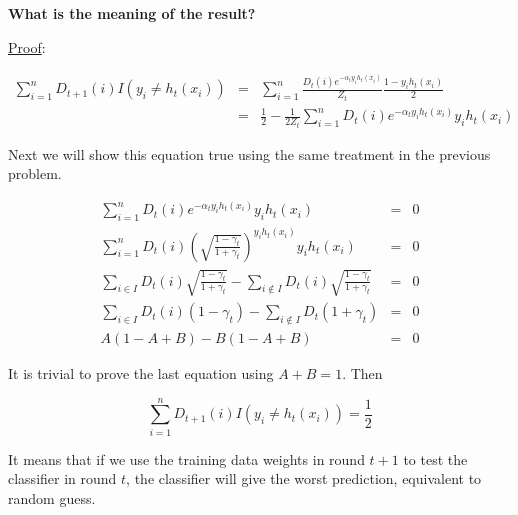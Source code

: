 \documentclass[UTF8]{ctexart}
\begin{document}
\textbf{What is the meaning of the result?}\par
\uline{Proof}:\par
\begin{eqnarray*}
\sum_{i=1}^{n}D_{t+1}(i)I(y_{i}\neq h_{t}(x_{i}))&=&\sum_{i=1}^{n}\frac{D_{t}(i)e^{-\alpha_{t}y_{i}h_{t}(x_{i})}}{Z_{t}}\frac{1-y_{i}h_{t}(x_{i})}{2}\\
&=&\frac{1}{2}-\frac{1}{2Z_{t}}\sum_{i=1}^{n}D_{t}(i)e^{-\alpha_{t}y_{i}h_{t}(x_{i})}y_{i}h_{t}(x_{i})
\end{eqnarray*}\par
Next we will show this equation true using the same treatment in the previous problem.\par
\begin{eqnarray*}
\sum_{i=1}^{n}D_{t}(i)e^{-\alpha_{t}y_{i}h_{t}(x_{i})}y_{i}h_{t}(x_{i})&=&0\\
\sum_{i=1}^{n}D_{t}(i)\left(\sqrt{\frac{1-\gamma_{t}}{1+\gamma_{t}}}\right)^{y_{i}h_{t}(x_{i})}y_{i}h_{t}(x_{i})&=&0\\
\sum_{i\in I}D_{t}(i)\sqrt{\frac{1-\gamma_{t}}{1+\gamma_{t}}}-\sum_{i\notin I}D_{t}(i)\sqrt{\frac{1-\gamma_{t}}{1+\gamma_{t}}}&=&0\\
\sum_{i\in I}D_{t}(i)(1-\gamma_{t})-\sum_{i\notin I}D_{t}(1+\gamma_{t})&=&0\\
A(1-A+B)-B(1-A+B)&=&0
\end{eqnarray*}\par
It is trivial to prove the last equation using $A+B=1$. Then\par
\begin{equation*}
\sum_{i=1}^{n}D_{t+1}(i)I(y_{i}\neq h_{t}(x_{i}))=\frac{1}{2}
\end{equation*}\par
It means that if we use the training data weights in round $t+1$ to test the classifier in round $t$, the classifier will give the worst prediction, equivalent to random guess.
\end{document}
